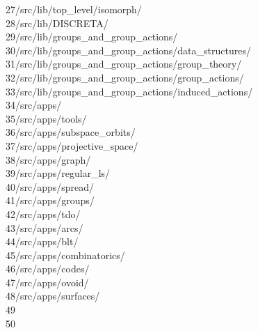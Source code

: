 \begin{tabbing}
27\>/src/lib/top\_level/isomorph/\\[0pt]
28\>/src/lib/DISCRETA/\\[0pt]
29\>/src/lib/groups\_and\_group\_actions/\\[0pt]
30\>/src/lib/groups\_and\_group\_actions/data\_structures/\\[0pt]
31\>/src/lib/groups\_and\_group\_actions/group\_theory/\\[0pt]
32\>/src/lib/groups\_and\_group\_actions/group\_actions/\\[0pt]
33\>/src/lib/groups\_and\_group\_actions/induced\_actions/\\[0pt]
34\>/src/apps/\\[0pt]
35\>/src/apps/tools/\\[0pt]
36\>/src/apps/subspace\_orbits/\\[0pt]
37\>/src/apps/projective\_space/\\[0pt]
38\>/src/apps/graph/\\[0pt]
39\>/src/apps/regular\_ls/\\[0pt]
40\>/src/apps/spread/\\[0pt]
41\>/src/apps/groups/\\[0pt]
42\>/src/apps/tdo/\\[0pt]
43\>/src/apps/arcs/\\[0pt]
44\>/src/apps/blt/\\[0pt]
45\>/src/apps/combinatorics/\\[0pt]
46\>/src/apps/codes/\\[0pt]
47\>/src/apps/ovoid/\\[0pt]
48\>/src/apps/surfaces/\\[0pt]
49\>\\[0pt]
50\>\end{tabbing}
